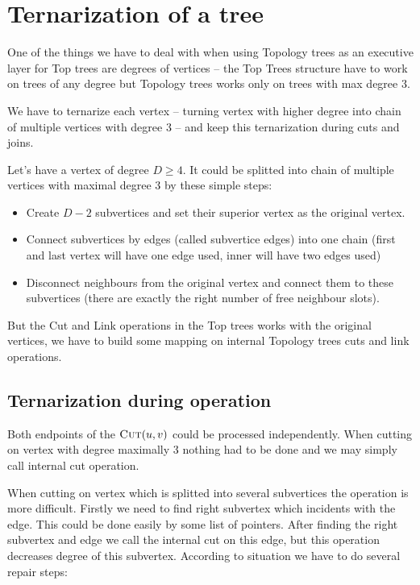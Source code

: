 \section{Ternarization of a tree}

One of the things we have to deal with when using Topology trees as an executive
layer for Top trees are degrees of vertices -- the Top Trees structure have to
work on trees of any degree but Topology trees works only on trees with max
degree 3.

We have to {\I ternarize} each vertex -- turning vertex with higher degree into
chain of multiple vertices with degree 3 -- and keep this ternarization during
cuts and joins.

Let's have a vertex of degree $D\ge4$. It could be splitted into chain of
multiple vertices with maximal degree 3 by these simple steps:
\begin{itemize}
\item Create $D - 2$ {\I subvertices} and set their {\I superior vertex} as the
original vertex.
\item Connect subvertices by edges (called {\I subvertice edges}) into one chain (first
and last vertex will have one edge used, inner will have two edges used)
\item Disconnect neighbours from the original vertex and connect them to these
subvertices (there are exactly the right number of free neighbour slots).
\end{itemize}

But the Cut and Link operations in the Top trees works with the original
vertices, we have to build some mapping on internal Topology trees cuts and link
operations.

\subsection{Ternarization during \Cut{} operation}

Both endpoints of the $\hbox{\sc Cut}(u,v)$ could be processed independently. When cutting on
vertex with degree maximally 3 nothing had to be done and we may simply call
internal cut operation.

When cutting on vertex which is splitted into several subvertices the operation
is more difficult. Firstly we need to find right subvertex which incidents with
the edge. This could be done easily by some list of pointers. After finding the
right subvertex and edge we call the internal cut on this edge, but this
operation decreases degree of this subvertex. According to situation we have to
do several repair steps:

